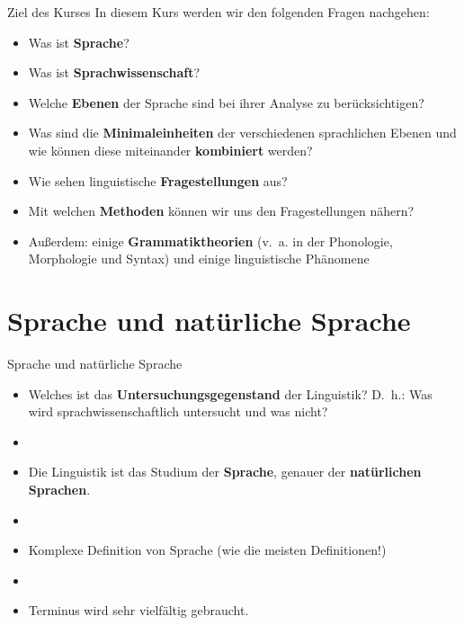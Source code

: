 \begin{frame}{Ziel des Kurses}
		In diesem Kurs werden wir den folgenden Fragen nachgehen:
		
\begin{itemize}
		\item<1-> Was ist \textbf{Sprache}?
		\item<2-> Was ist \textbf{Sprachwissenschaft}?
		\item<3-> Welche \textbf{Ebenen} der Sprache sind bei ihrer Analyse zu berücksichtigen?
		\item<4-> Was sind die \textbf{Minimaleinheiten} der verschiedenen sprachlichen Ebenen und wie können diese miteinander \textbf{kombiniert} werden?
		\item<5-> Wie sehen linguistische \textbf{Fragestellungen} aus?
		\item<6-> Mit welchen \textbf{Methoden} können wir uns den Fragestellungen nähern?
		\item<7-> Außerdem: einige \textbf{Grammatiktheorien} (v.~a. in der Phonologie, Morphologie und Syntax) und einige linguistische Phänomene
\end{itemize}

\end{frame}



\section{Sprache und natürliche Sprache}

\begin{frame}{Sprache und natürliche Sprache}
	
\begin{itemize}
	\item Welches ist das \textbf{Untersuchungsgegenstand} der Linguistik? D.~h.: Was wird sprachwissenschaftlich untersucht und was nicht?
	\item[]
	\item Die Linguistik ist das Studium der \textbf{Sprache}, genauer der \textbf{natürlichen Sprachen}.
	\item[]
	\item Komplexe Definition von Sprache (wie die meisten Definitionen!)
	\item[]
	\item Terminus  wird sehr vielfältig gebraucht.
\end{itemize}

\end{frame}

